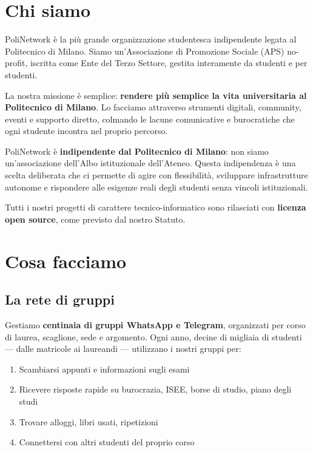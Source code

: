 \documentclass[letter]{core/polinetwork}
\begin{document}
\pnMakeHeader

\section{Chi siamo}

PoliNetwork è la più grande organizzazione studentesca indipendente
legata al Politecnico di Milano. Siamo un'Associazione di Promozione
Sociale (APS) no-profit, iscritta come Ente del Terzo Settore,
gestita interamente da studenti e per studenti.

La nostra missione è semplice: \textbf{rendere più semplice la vita
universitaria al Politecnico di Milano}. Lo facciamo attraverso
strumenti digitali, community, eventi e supporto diretto, colmando
le lacune comunicative e burocratiche che ogni studente incontra nel
proprio percorso.

PoliNetwork è \textbf{indipendente dal Politecnico di Milano}: non
siamo un'associazione dell'Albo istituzionale dell'Ateneo.
Questa indipendenza è una scelta deliberata che ci permette di agire
con flessibilità, sviluppare infrastrutture autonome e rispondere
alle esigenze reali degli studenti senza vincoli istituzionali.

Tutti i nostri progetti di carattere tecnico-informatico sono
rilasciati con \textbf{licenza open source}, come previsto dal
nostro Statuto.

\section{Cosa facciamo}

\subsection{La rete di gruppi}

Gestiamo \textbf{centinaia di gruppi WhatsApp e Telegram}, organizzati
per corso di laurea, scaglione, sede e argomento. Ogni anno, decine di
migliaia di studenti — dalle matricole ai laureandi — utilizzano i
nostri gruppi per:

\begin{enumerate}[leftmargin=2em]
    \item Scambiarsi appunti e informazioni sugli esami
    \item Ricevere risposte rapide su burocrazia, ISEE, borse di studio, piano degli studi
    \item Trovare alloggi, libri usati, ripetizioni
    \item Connettersi con altri studenti del proprio corso
\end{enumerate}
\end{document}
